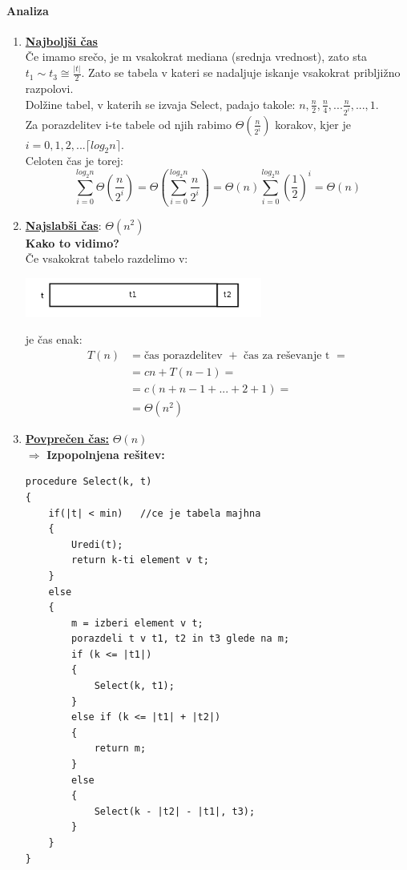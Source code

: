 \documentclass[a4paper,10pt]{article}
\begin{document}
\paragraph{Analiza}
\begin{enumerate}
\item \underline{\textbf{Najbolj\v si \v cas}}\\
	\v Ce imamo sre\v co, je m vsakokrat mediana (srednja vrednost), zato sta $t_1 \sim t_3 \cong \frac{\vert t \vert}{2}$. Zato se tabela v kateri se nadaljuje iskanje vsakokrat priblji\v zno razpolovi.\\
	Dol\v zine tabel, v katerih se izvaja Select, padajo takole: $n, \frac{n}{2}, \frac{n}{4},... \frac{n}{2^i},..., 1$.\\
	Za porazdelitev i-te tabele od njih rabimo $\Theta (\frac{n}{2^i})$ korakov, kjer je $i = 0, 1, 2,... \lceil log_2 n \rceil$.\\
	Celoten \v cas je torej:
	$$
	\sum_{i=0}^{log_2 n} \Theta (\frac{n}{2^i}) = \Theta (\sum_{i=0}^{log_2 n} \frac{n}{2^i}) = \Theta (n)\sum_{i=0}^{log_2 n}\left( \frac{1}{2} \right)^i = \Theta (n) 
	$$
\item \underline{\textbf{Najslab\v si \v cas}}: $\Theta (n^2)$ \\
	\textbf{Kako to vidimo?} \\
	\v Ce vsakokrat tabelo razdelimo v:
	
	\begin{center}
	\includegraphics[width=7.8cm,height=1.3cm]{Slike/IskanjeElementaTabela1}
	\end{center}

	je \v cas enak:
	$$
	\begin{array}{ll}
	T(n) & = \mbox{\v cas porazdelitev } + \mbox{ \v cas za re\v sevanje t } = \\
	 & = cn + T(n-1) = \\
	 & = c(n + n-1 + ... + 2 + 1) = \\
	 & = \Theta (n^2)
	\end{array}
	$$
\item \textbf{\underline{Povpre\v cen \v cas:}} $\Theta (n)$ \\
	$\Rightarrow$ \textbf{Izpopolnjena re\v sitev:}
\begin{lstlisting}
procedure Select(k, t)
{
    if(|t| < min)   //ce je tabela majhna
    {
        Uredi(t);
        return k-ti element v t;
    }
    else
    {
        m = izberi element v t;
        porazdeli t v t1, t2 in t3 glede na m;
        if (k <= |t1|)
        {
            Select(k, t1);
        }
        else if (k <= |t1| + |t2|)
        {
            return m;
        }
        else
        {
            Select(k - |t2| - |t1|, t3);
        }
    }
}
\end{lstlisting}
\end{enumerate}
\end{document}
